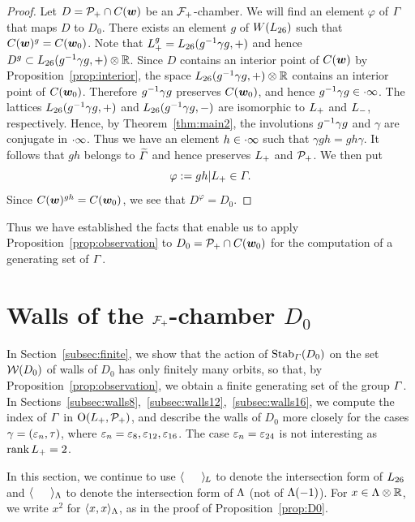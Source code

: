 \documentclass{amsart} %
\begin{document}
%
\begin{proof}
Let $D=\mathord{\mathcal{P}}_{+} \cap \mathord{C}(\boldsymbol{w})$ be an $\mathord{\mathcal{F}}_{+}$-chamber.
We will find an element $\varphi$ of $\varGamma$ 
that maps $D$ to $D_0$.
There exists an element $g$ of $W(L_{26})$
such that $\mathord{C}(\boldsymbol{w})^g=\mathord{C}(\boldsymbol{w}_0)$.
Note that $L_{+}^g=L_{26}(g^{-1} \gamma g, +)$
and hence $D^g\subset L_{26}(g^{-1} \gamma g, +)\otimes \mathord{\mathbb{R}}$.
Since $D$ contains an interior point of $\mathord{C}(\boldsymbol{w})$ by 
Proposition~\ref{prop:interior},
the space $L_{26}(g^{-1} \gamma g, +)\otimes \mathord{\mathbb{R}}$ contains an interior point of $\mathord{C}(\boldsymbol{w}_0)$.
Therefore $g^{-1} \gamma g$ preserves $\mathord{C}(\boldsymbol{w}_0)$,
and hence $g^{-1} \gamma g \in \cdot \infty$.
The lattices $L_{26}(g^{-1} \gamma g, + )$ and $L_{26}(g^{-1} \gamma g, -)$
are isomorphic to $L_{+}$ and $L_{-}$, respectively.
Hence, by Theorem~\ref{thm:main2},
the involutions $g^{-1} \gamma g$ and $\gamma$ are conjugate in $\cdot \infty$.
Thus we have an element $h\in \cdot \infty$
such that $\gamma g h =gh\gamma $.
It follows that $gh$ belongs to $\widetilde{\varGamma}$ and hence preserves $L_{+}$ and $\mathord{\mathcal{P}}_{+}$.
We then put
\[
\varphi:=gh|L_{+}\in \varGamma.
\]
Since $\mathord{C}(\boldsymbol{w})^{gh}=\mathord{C}(\boldsymbol{w}_0)$,
we see that $D^\varphi=D_0$.
\end{proof}
%
Thus we have established the facts that enable us 
to apply Proposition~\ref{prop:observation}
to $D_0=\mathord{\mathcal{P}}_{+}\cap \mathord{C}(\boldsymbol{w}_0)$ 
for the computation of a generating set of
$\varGamma$.
%
%
\section{Walls of the $\mathord{\mathcal{F}}_{+}$-chamber $D_0$}\label{sec:wallsD0}
%
In Section~\ref{subsec:finite},
we show that 
the action of $\operatorname{Stab}_{\varGamma}(D_0)$ on the set $\mathord{\mathcal{W}}(D_0)$ of 
walls of $D_0$ has only finitely many orbits,
so that, by Proposition~\ref{prop:observation},
we obtain a finite generating set of the group $\varGamma$.
In Sections~\ref{subsec:walls8},~\ref{subsec:walls12},~\ref{subsec:walls16}, 
we compute the index of $\varGamma$ in
$\mathord{\mathrm{O}}(L_{+}, \mathord{\mathcal{P}}_{+})$,
and describe the walls of $D_0$ more closely
for the cases $\gamma=(\varepsilon_n, \tau)$,
where $\varepsilon_n=\varepsilon_8, \varepsilon_{12}, \varepsilon_{16}$.
The case $\varepsilon_n=\varepsilon_{24}$ is not interesting as $\operatorname{rank} L_{+}=2$.
%
\par
In this section,
we continue to use
$\langle \phantom{a, a} \rangle_{\hskip -1pt L}$ to denote the intersection form of $L_{26}$
and $\langle \phantom{a, a} \rangle_{\Lambda}$ to denote the intersection form of $\Lambda$
(not of $\Lambda(-1)$).
For $x\in \Lambda\otimes\mathord{\mathbb{R}}$, we write $x^2$ for $\langle x,x \rangle_{\Lambda}$,
as in the proof of Proposition~\ref{prop:D0}.
%
\end{document}
